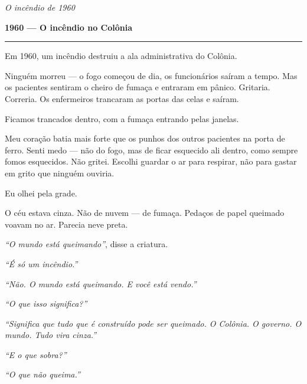 
\noindent \textit{O incêndio de 1960}

\noindent \textbf{1960 --- O incêndio no Colônia}

\vspace{0.5em}\noindent\rule{\textwidth}{0.5pt}\vspace{0.5em}

\noindent Em 1960, um incêndio destruiu a ala administrativa do Colônia.

\noindent Ninguém morreu --- o fogo começou de dia, os funcionários saíram a tempo. Mas os pacientes sentiram o cheiro de fumaça e entraram em pânico. Gritaria. Correria. Os enfermeiros trancaram as portas das celas e saíram.

\noindent Ficamos trancados dentro, com a fumaça entrando pelas janelas.

\noindent Meu coração batia mais forte que os punhos dos outros pacientes na porta de ferro. Senti medo --- não do fogo, mas de ficar esquecido ali dentro, como sempre fomos esquecidos. Não gritei. Escolhi guardar o ar para respirar, não para gastar em grito que ninguém ouviria.

\noindent Eu olhei pela grade.

\noindent O céu estava cinza. Não de nuvem --- de fumaça. Pedaços de papel queimado voavam no ar. Parecia neve preta.

\noindent \textit{\textquotedblleft{}O mundo está queimando\textquotedblright{}}, disse a criatura.

\noindent \textit{\textquotedblleft{}É só um incêndio.\textquotedblright{}}

\noindent \textit{\textquotedblleft{}Não. O mundo está queimando. E você está vendo.\textquotedblright{}}

\noindent \textit{\textquotedblleft{}O que isso significa?\textquotedblright{}}

\noindent \textit{\textquotedblleft{}Significa que tudo que é construído pode ser queimado. O Colônia. O governo. O mundo. Tudo vira cinza.\textquotedblright{}}

\noindent \textit{\textquotedblleft{}E o que sobra?\textquotedblright{}}

\noindent \textit{\textquotedblleft{}O que não queima.\textquotedblright{}}


